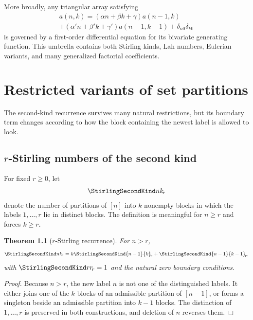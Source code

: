 \documentclass[11pt,a4paper,oneside,openany]{book}
\newtheorem{theorem}{Theorem}[chapter]
\theoremstyle{definition}
\theoremstyle{remark}
\begin{document}
More broadly, any triangular array satisfying
\begin{multline}\label{eq:triangular-general-recurrence}
 a(n,k)=(\alpha n+\beta k+\gamma)a(n-1,k)\\
 +(\alpha'n+\beta'k+\gamma')a(n-1,k-1)+\delta_{n0}\delta_{k0}
\end{multline}
is governed by a first-order differential equation for its bivariate generating
function.  This umbrella contains both Stirling kinds, Lah numbers, Eulerian
variants, and many generalized factorial coefficients.



\chapter{Restricted variants of set partitions}
\label{ch:stirling-variants}
The second-kind recurrence survives many natural restrictions, but its boundary
term changes according to how the block containing the newest label is allowed to
look.

\section{\texorpdfstring{$r$}{r}-Stirling numbers of the second kind}
For fixed $r\ge0$, let
\[
 \StirlingSecondKind nk_{\!r}
\]
denote the number of partitions of $[n]$ into $k$ nonempty blocks in which the
labels $1,\ldots,r$ lie in distinct blocks.  The definition is meaningful for
$n\ge r$ and forces $k\ge r$.

\begin{theorem}[$r$-Stirling recurrence]
\label{thm:r-stirling-recurrence}
For $n>r$,
\begin{equation}
\label{eq:r-stirling-recurrence}
 \StirlingSecondKind nk_{\!r}
 =k\StirlingSecondKind{n-1}{k}_{\!r}+\StirlingSecondKind{n-1}{k-1}_{\!r},
\end{equation}
with $\StirlingSecondKind rr_{\!r}=1$ and the natural zero boundary conditions.
\end{theorem}
\begin{proof}
Because $n>r$, the new label $n$ is not one of the distinguished labels.  It either
joins one of the $k$ blocks of an admissible partition of $[n-1]$, or forms a
singleton beside an admissible partition into $k-1$ blocks.  The distinction of
$1,\ldots,r$ is preserved in both constructions, and deletion of $n$ reverses
them.
\end{proof}
\end{document}
